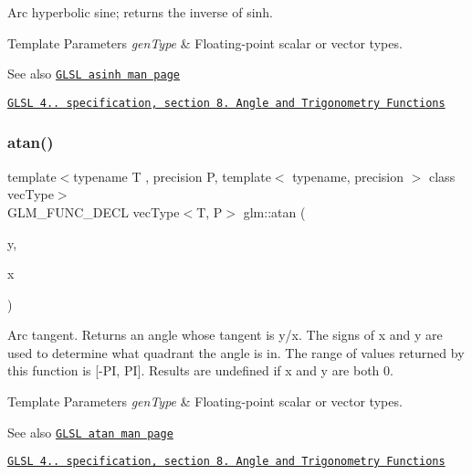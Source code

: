 Arc hyperbolic sine; returns the inverse of sinh.


\begin{DoxyTemplParams}{Template Parameters}
{\em gen\+Type} & Floating-\/point scalar or vector types.\\
\hline
\end{DoxyTemplParams}
\begin{DoxySeeAlso}{See also}
\href{http://www.opengl.org/sdk/docs/manglsl/xhtml/asinh.xml}{\tt G\+L\+SL asinh man page} 

\href{http://www.opengl.org/registry/doc/GLSLangSpec.4.20.8.pdf}{\tt G\+L\+SL 4.. specification, section 8. Angle and Trigonometry Functions} 
\end{DoxySeeAlso}
\mbox{\label{group__core__func__trigonometric_ga461e769acb8b8cb695a5a89334546611}} 
\subsubsection{\texorpdfstring{atan()}{atan()}\hspace{0.1cm}{\footnotesize\ttfamily [1/2]}}
{\footnotesize\ttfamily template$<$typename T , precision P, template$<$ typename, precision $>$ class vec\+Type$>$ \\
G\+L\+M\+\_\+\+F\+U\+N\+C\+\_\+\+D\+E\+CL vec\+Type$<$T, P$>$ glm\+::atan (\begin{DoxyParamCaption}\item[{vec\+Type$<$ T, P $>$ const \&}]{y,  }\item[{vec\+Type$<$ T, P $>$ const \&}]{x }\end{DoxyParamCaption})}

Arc tangent. Returns an angle whose tangent is y/x. The signs of x and y are used to determine what quadrant the angle is in. The range of values returned by this function is \mbox{[}-\/\+PI, PI\mbox{]}. Results are undefined if x and y are both 0.


\begin{DoxyTemplParams}{Template Parameters}
{\em gen\+Type} & Floating-\/point scalar or vector types.\\
\hline
\end{DoxyTemplParams}
\begin{DoxySeeAlso}{See also}
\href{http://www.opengl.org/sdk/docs/manglsl/xhtml/atan.xml}{\tt G\+L\+SL atan man page} 

\href{http://www.opengl.org/registry/doc/GLSLangSpec.4.20.8.pdf}{\tt G\+L\+SL 4.. specification, section 8. Angle and Trigonometry Functions} 
\end{DoxySeeAlso}
\mbox{\label{group__core__func__trigonometric_gae8f22458bba8f2321ceb1bfc4a543216}} 

